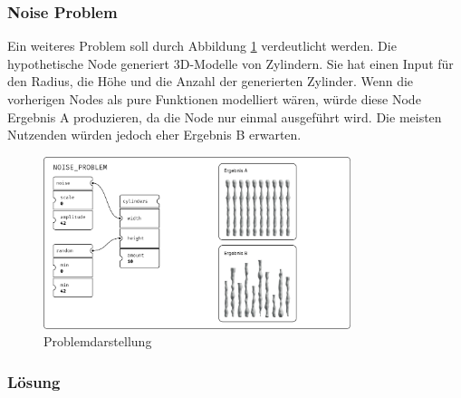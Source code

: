 \documentclass[ngerman]{article}
\begin{document}
\pagebreak

\subsubsection*{Noise Problem}

Ein weiteres Problem soll durch Abbildung \ref{fig:noise_problem} verdeutlicht werden. 
Die hypothetische  Node generiert 3D-Modelle von Zylindern. Sie hat einen Input für den Radius, die Höhe und die Anzahl der generierten Zylinder. 
\br
Wenn die vorherigen Nodes als pure Funktionen modelliert wären, würde diese Node Ergebnis A produzieren, da die  Node nur einmal ausgeführt wird. Die meisten Nutzenden würden jedoch eher Ergebnis B erwarten.

\begin{figure}[htbp]
  \centering
  \includegraphics[width=0.8\textwidth]{./graphics/NOISE_PROBLEM.pdf}
  \caption{Problemdarstellung}
  \label{fig:noise_problem}
\end{figure}

\subsubsection*{Lösung}
\end{document}
